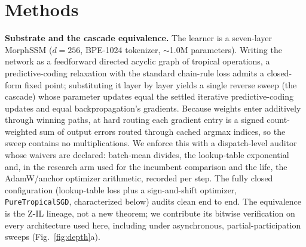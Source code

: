 \documentclass[sn-nature]{sn-jnl}   %
\newcommand{\heading}[1]{\vspace{4pt}\noindent\textbf{#1}\hspace{0.6em}}
\begin{document}
\vspace{6pt}
\section*{Methods}
\small

\heading{Substrate and the cascade equivalence.}
The learner is a seven-layer MorphSSM ($d{=}256$, BPE-1024 tokenizer,
$\sim$1.0M parameters). Writing the network as a feedforward directed acyclic
graph of tropical operations, a predictive-coding relaxation with the standard
chain-rule loss admits a closed-form fixed point; substituting it layer by layer
yields a single reverse sweep (the cascade) whose parameter updates equal the
settled iterative predictive-coding updates and equal backpropagation's
gradients. Because weights enter additively through winning paths, at hard
routing each gradient entry is a signed count-weighted sum of output errors
routed through cached argmax indices, so the sweep contains no multiplications.
We enforce this with a dispatch-level auditor whose waivers are declared:
batch-mean divides, the lookup-table exponential and, in the research arm used
for the incumbent comparison and the life, the AdamW/anchor optimizer arithmetic,
recorded per step. The fully closed configuration (lookup-table loss plus a
sign-and-shift optimizer, \texttt{PureTropicalSGD}, characterized below) audits
clean end to end. The equivalence is the Z-IL
lineage\cite{song2020can}, not a new theorem; we contribute its bitwise
verification on every architecture used here, including under asynchronous,
partial-participation sweeps (Fig.~\ref{fig:depth}a).
\end{document}
